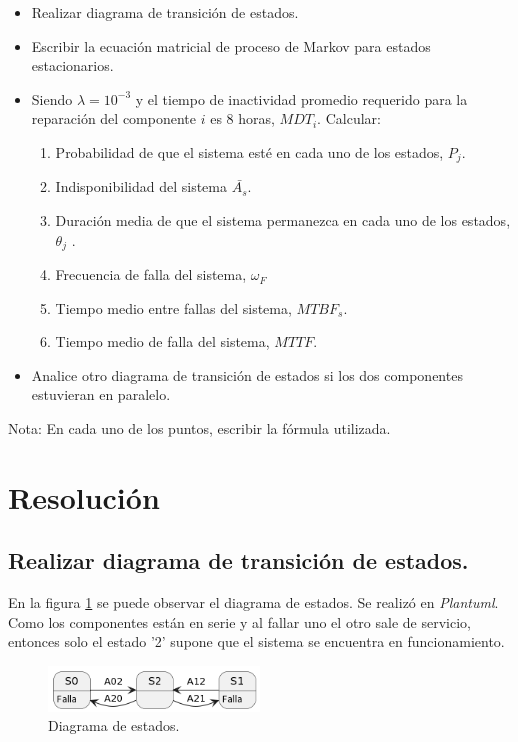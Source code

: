 \documentclass[
    11pt,
    spanish,
    a4paper
]{article}
\begin{document}
\begin{itemize}
	\item Realizar diagrama de transición de estados.
	\item Escribir la ecuación matricial de proceso de Markov para estados estacionarios.
	\item Siendo $ \lambda=10^{-3} $ y el tiempo de inactividad promedio requerido para la reparación del componente $ i $ es 8 horas, $ MDT_i $. Calcular:
	      \begin{enumerate}
		      \item Probabilidad de que el sistema esté en cada uno de los estados, $ P_j $.
		      \item Indisponibilidad del sistema $ \bar{A_s} $.
		      \item Duración media de que el sistema permanezca en cada uno de los estados, $ \theta_j $ .
		      \item Frecuencia de falla del sistema, $ \omega_F $
		      \item Tiempo medio entre fallas del sistema, $ MTBF_s $.
		      \item Tiempo medio de falla del sistema, $ MTTF $.
	      \end{enumerate}
	\item Analice otro diagrama de transición de estados si los dos componentes estuvieran en paralelo.
\end{itemize}

Nota: En cada uno de los puntos, escribir la fórmula utilizada.

\section{Resolución}

\subsection{Realizar diagrama de transición de estados.}

En la figura \ref{fig:diagrama_estados} se puede observar el diagrama de estados. Se realizó en \emph{Plantuml}.
Como los componentes están en serie y al fallar uno el otro sale de servicio, entonces solo el estado '2' supone que el sistema se encuentra en funcionamiento.

\begin{figure}[htbp]
	\centering
	\includegraphics[width=0.5\textwidth]{img/diagrama_estados.png}
	\caption{Diagrama de estados.}
	\label{fig:diagrama_estados}
\end{figure}
\end{document}
